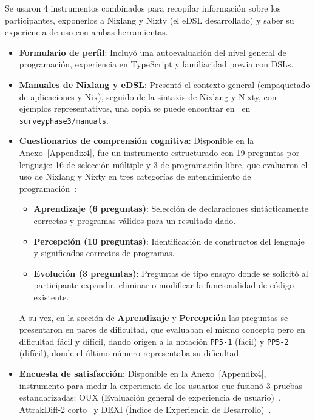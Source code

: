 Se usaron 4 instrumentos combinados para recopilar información sobre los participantes, exponerlos a Nixlang y Nixty (el eDSL desarrollado) y saber su experiencia de uso con ambas herramientas.

\begin{itemize}
\item \textbf{Formulario de perfil}: Incluyó una autoevaluación del nivel general de programación, experiencia en TypeScript y
familiaridad previa con DSLs.
\item \textbf{Manuales de Nixlang y eDSL}: Presentó el contexto general
(empaquetado de aplicaciones y Nix), seguido de la sintaxis de Nixlang y Nixty, con ejemplos
representativos, una copia se puede encontrar en~\cite{rayoNixEveryoneRepository} en \texttt{survey\textunderscore{}\allowbreak{}phase3/\allowbreak{}manuals}.
\item \textbf{Cuestionarios de comprensión cognitiva}: Disponible en la Anexo~\ref{Appendix4}, fue un instrumento estructurado con
19 preguntas por lenguaje: 16 de selección múltiple y 3 de programación libre, que evaluaron el uso de Nixlang y Nixty en tres categorías de entendimiento de programación~\cite{mernikPDFComparisonXAML2009}:

\begin{itemize}
\item \textbf{Aprendizaje (6 preguntas)}: Selección de declaraciones sintácticamente correctas y
programas válidos para un resultado dado.
\item \textbf{Percepción (10 preguntas)}: Identificación de constructos del lenguaje y
significados correctos de programas.
\item \textbf{Evolución (3 preguntas)}: Preguntas de tipo ensayo donde se solicitó al
participante expandir, eliminar o modificar la funcionalidad de código
existente.
\end{itemize}

A su vez, en la sección de \textbf{Aprendizaje} y \textbf{Percepción} las preguntas se presentaron en pares de dificultad, que evaluaban el mismo concepto pero en dificultad fácil y difícil, dando origen a la notación \texttt{PP5-1} (fácil) y \texttt{PP5-2} (difícil), donde el último número representaba su dificultad.
\item \textbf{Encuesta de satisfacción}: Disponible en la Anexo~\ref{Appendix4}, instrumento para medir la experiencia de los usuarios que fusionó 3 pruebas estandarizadas: OUX (Evaluación general de experiencia de usuario)~\cite{Kuusinen2016}, AttrakDiff-2 corto~\cite{PDFNeedsAffect} y DEXI (Índice de Experiencia de Desarrollo)~\cite{Kuusinen2016}.
\end{itemize}

